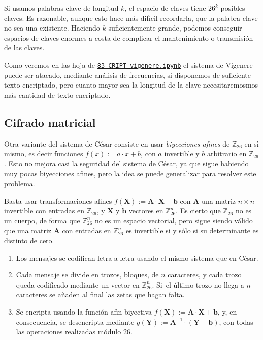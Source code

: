  Si usamos palabras clave de longitud $k$, el espacio de claves tiene $26^k$
posibles claves. Es razonable, aunque esto hace m\'as
dif\'{\i}cil recordarla,  que la palabra clave no sea una existente. Haciendo
$k$ suficientemente grande, podemos conseguir espacios de claves enormes a costa
de complicar el mantenimiento o transmisi\'on de las claves. 

Como veremos en las hoja de {\sage}
\href{http://localhost:8888/notebooks/CRIPT/83-CRIPT-vigenere.ipynb}{\tt 83-CRIPT-vigenere.ipynb}
el sistema de  Vigenere puede ser atacado, mediante an\'alisis de frecuencias, 
si disponemos de suficiente texto encriptado, pero cuanto  mayor sea la 
longitud 
de la clave 
necesitaremosmos m\'as cantidad de texto encriptado.




\subsection{Cifrado matricial}


Otra variante del sistema de C\'esar consiste en usar {\itshape biyecciones
afines} de $\mathbb{Z}_{26}$ en s\'{\i} mismo, es decir funciones $f(x):=a\cdot
x +b$, con $a$ invertible y $b$ arbitrario en $\mathbb{Z}_{26}$.  Esto no mejora
casi la seguridad del sistema de C\'esar, ya que sigue habiendo muy pocas
biyecciones afines, pero la idea se puede generalizar para resolver este
problema. 

Basta usar transformaciones afines $f(\mathbf{X}):=\mathbf{A}\cdot
\mathbf{X} +\mathbf{b}$ con $\mathbf{A}$ una matriz $n\times n$ invertible con
entradas en $\mathbb{Z}_{26}$, y $\mathbf{X}$ y $\mathbf{b}$ vectores en
$\mathbb{Z}_{26}^n$. Es cierto que $\mathbb{Z}_{26}$ no es un cuerpo, de forma 
que
$\mathbb{Z}_{26}^n$ no es un espacio vectorial, pero sigue siendo v\'alido que 
una
matriz $\mathbf{A}$ con entradas en 
 $\mathbb{Z}_{26}^n$ es invertible si y s\'olo si su determinante es distinto de
cero.

\begin{enumerate}
 \item Los mensajes se codifican letra a letra usando el mismo sistema que en
C\'esar.
 \item Cada mensaje se divide en trozos, bloques,  de $n$ caracteres, y cada
trozo queda codificado mediante un vector en $\mathbb{Z}_{26}^n$. Si~el \'ultimo
trozo no llega a $n$ caracteres se a\~naden al final las zetas que hagan falta.

\item Se encripta usando la funci\'on af\'{\i}n biyectiva
$f(\mathbf{X}):=\mathbf{A}\cdot
\mathbf{X} +\mathbf{b}$, y, en consecuencia, se desencripta mediante
$g(\mathbf{Y}):=\mathbf{A}^{-1}\cdot(
\mathbf{Y} -\mathbf{b})$, con todas las operaciones realizadas m\'odulo $26$.
 \end{enumerate}

